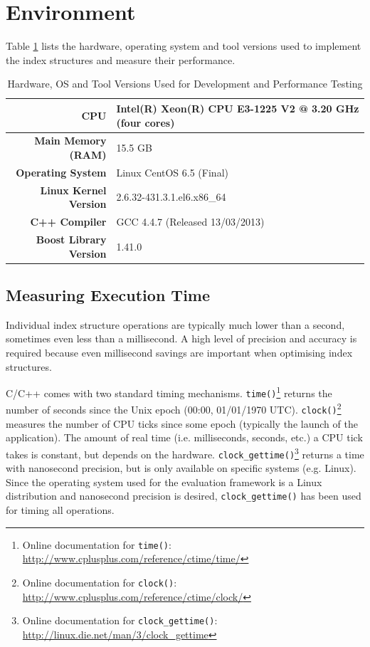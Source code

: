 \section{Environment}

Table \ref{tab:system-specifications} lists the hardware, operating system and tool versions used to implement the index structures and measure their performance. 

\begin{table}
	\centering
	\begin{tabular}{|r|l|}
		\hline
		\textbf{CPU} & Intel(R) Xeon(R) CPU E3-1225 V2 @ 3.20 GHz (four cores) \\
		\hline
		\textbf{Main Memory (RAM)} & 15.5 GB \\
		\hline
		\textbf{Operating System} & Linux CentOS 6.5 (Final) \\
		\hline
		\textbf{Linux Kernel Version} & 2.6.32-431.3.1.el6.x86\_64 \\
		\hline
		\textbf{C++ Compiler} & GCC 4.4.7 (Released 13/03/2013) \\
		\hline
		\textbf{Boost Library Version} & 1.41.0 \\
		\hline
	\end{tabular}
	\caption{Hardware, OS and Tool Versions Used for Development and Performance Testing}
	\label{tab:system-specifications}
\end{table}

\subsection{Measuring Execution Time}

Individual index structure operations are typically much lower than a second, sometimes even less than a millisecond. A high level of precision and accuracy is required because even millisecond savings are important when optimising index structures.

C/C++ comes with two standard timing mechanisms. \texttt{time()}\footnote{Online documentation for \texttt{time()}: \url{http://www.cplusplus.com/reference/ctime/time/}} returns the number of seconds since the Unix epoch (00:00, 01/01/1970 UTC). \texttt{clock()}\footnote{Online documentation for \texttt{clock()}: \url{http://www.cplusplus.com/reference/ctime/clock/}} measures the number of CPU ticks since some epoch (typically the launch of the application). The amount of real time (i.e. milliseconds, seconds, etc.) a CPU tick takes is constant, but depends on the hardware. \texttt{clock\_gettime()}\footnote{Online documentation for \texttt{clock\_gettime()}: \url{http://linux.die.net/man/3/clock_gettime}} returns a time with nanosecond precision, but is only available on specific systems (e.g. Linux). Since the operating system used for the evaluation framework is a Linux distribution and nanosecond precision is desired, \texttt{clock\_gettime()} has been used for timing all operations.